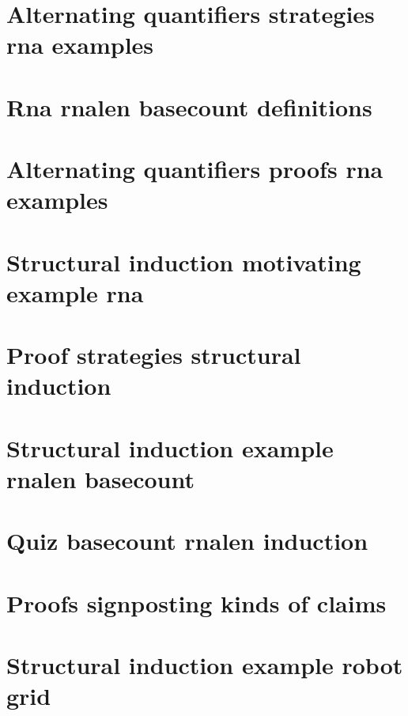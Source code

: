 \section*{Alternating quantifiers strategies rna examples}

\vfill
\section*{Rna rnalen basecount definitions}

\vfill
\section*{Alternating quantifiers proofs rna examples}

\vfill
\section*{Structural induction motivating example rna}

\vfill
\section*{Proof strategies structural induction}

\vfill
\section*{Structural induction example rnalen basecount}

\vfill
\section*{Quiz basecount rnalen induction}

\vfill
\section*{Proofs signposting kinds of claims}

\vfill
\section*{Structural induction example robot grid}

\vfill

